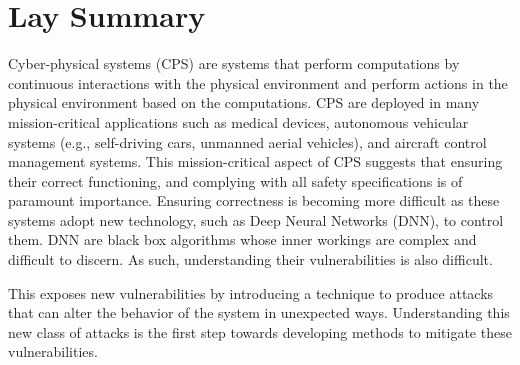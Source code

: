 

\chapter{Lay Summary}

Cyber-physical systems (CPS) are systems that perform computations by continuous interactions with the physical environment and perform actions in the physical environment based on the computations. 
\ac{CPS} are deployed in many mission-critical applications such as medical devices, autonomous vehicular systems (e.g., self-driving cars, unmanned aerial vehicles), and aircraft control management systems. 
This mission-critical aspect of \ac{CPS} suggests that ensuring their correct functioning, and complying with all safety specifications is of paramount importance. 
Ensuring correctness is becoming more difficult as these systems adopt new technology, such as Deep Neural Networks (DNN), to control them. 
\ac{DNN} are black box algorithms whose inner workings are complex and difficult to discern.
As such, understanding their vulnerabilities is also difficult. 

This exposes new vulnerabilities by introducing a  technique to produce attacks that can alter the behavior of the system in unexpected ways. 
Understanding this new class of attacks is the first step towards developing methods to mitigate these vulnerabilities. 



 



